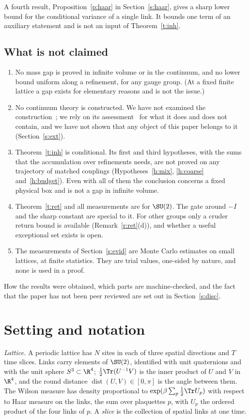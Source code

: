 A fourth result, Proposition~\ref{p:haar} in Section~\ref{s:haar}, gives a sharp lower bound for the
conditional variance of a single link. It bounds one term of an auxiliary statement and is not an input of
Theorem~\ref{t:inh}.

\subsection{What is not claimed}\label{s:not}
\begin{enumerate}
\item No mass gap is proved in infinite volume or in the continuum, and no lower bound uniform along a
refinement, for any gauge group. (At a fixed finite lattice a gap exists for elementary reasons and is not
the issue.)
\item No continuum theory is constructed. We have not examined the construction~\cite{OAI}; we rely on its
assessment~\cite{YMG} for what it does and does not contain, and we have not shown that any object of this
paper belongs to it (Section~\ref{s:ext}).
\item Theorem~\ref{t:inh} is conditional. Its first and third hypotheses, with the sums that the accumulation over
refinements needs, are not proved on any trajectory of matched couplings (Hypotheses~\ref{h:mix},
\ref{h:coarse} and~\ref{h:budget}). Even with all of them the conclusion concerns a
fixed physical box and is not a gap in infinite volume.
\item Theorem~\ref{t:ret} and all measurements are for $\SU(2)$. The gate around $-I$ and the sharp constant
are special to it. For other groups only a cruder return bound is available (Remark~\ref{r:ret}(d)), and
whether a useful exceptional set exists is open.
\item The measurements of Section~\ref{s:evid} are Monte Carlo estimates on small lattices, at finite
statistics. They are trial values, one-sided by nature, and none is used in a proof.
\end{enumerate}

How the results were obtained, which parts are machine-checked, and the fact that the paper has not been
peer reviewed are set out in Section~\ref{s:disc}.

\section{Setting and notation}\label{s:set}
\emph{Lattice.} A periodic lattice has $N$ sites in each of three spatial directions and $T$ time slices.
Links carry elements of $\SU(2)$, identified with unit quaternions and with the unit sphere $S^3\subset\R^4$;
$\tfrac12\Tr(U^{-1}V)$ is the inner product of $U$ and $V$ in $\R^4$, and the round distance
$\operatorname{dist}(U,V)\in[0,\pi]$ is the angle between them. The Wilson measure has density proportional
to $\exp(\beta\sum_p\tfrac12\Tr U_p)$ with respect to Haar measure on the links, the sum over plaquettes $p$,
with $U_p$ the ordered product of the four links of $p$. A \emph{slice} is the collection of spatial links at
one time.

